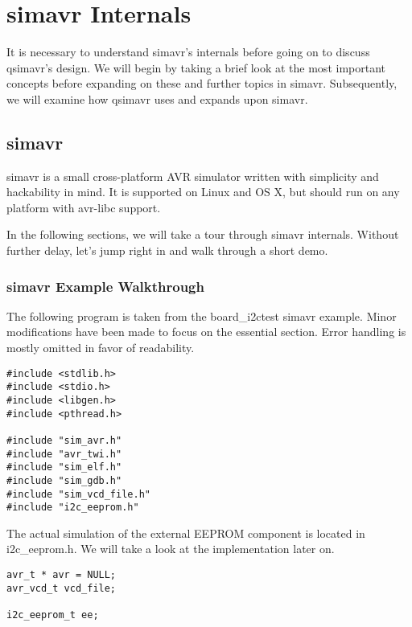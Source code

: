 
\chapter{simavr Internals} \label{chapter:simavr}

It is necessary to understand simavr's internals before going on to discuss
qsimavr's design. We will begin by taking a brief look at the most important
concepts before expanding on these and further topics in simavr. Subsequently,
we will examine how qsimavr uses and expands upon simavr.

\section{simavr}

simavr is a small cross-platform AVR simulator written with simplicity and
hackability in mind. It is supported on Linux and OS X, but should run on any
platform with avr-libc support.

In the following sections, we will take a tour through simavr internals.
Without further delay, let's jump right in and walk through a short demo.

\subsection{simavr Example Walkthrough}

The following program is taken from the board\_i2ctest simavr example. Minor
modifications have been made to focus on the essential section. Error handling
is mostly omitted in favor of readability.

\begin{lstlisting}
#include <stdlib.h>
#include <stdio.h>
#include <libgen.h>
#include <pthread.h>

#include "sim_avr.h"
#include "avr_twi.h"
#include "sim_elf.h"
#include "sim_gdb.h"
#include "sim_vcd_file.h"
#include "i2c_eeprom.h"
\end{lstlisting}

The actual simulation of the external EEPROM component is located in
i2c\_eeprom.h. We will take a look at the implementation later on.

\begin{lstlisting}
avr_t * avr = NULL;
avr_vcd_t vcd_file;

i2c_eeprom_t ee;
\end{lstlisting}

